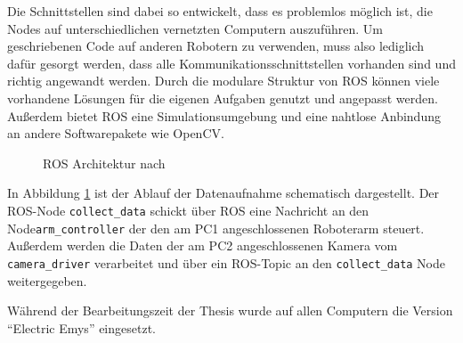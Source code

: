 Die Schnittstellen sind dabei so entwickelt, dass es problemlos möglich ist, die
Nodes auf unterschiedlichen vernetzten Computern auszuführen.  Um geschriebenen
Code auf anderen Robotern zu verwenden, muss also lediglich dafür gesorgt werden, dass
alle Kommunikationsschnittstellen vorhanden sind und richtig angewandt werden.
Durch die modulare Struktur von \ac{ROS} können viele vorhandene Lösungen für
die eigenen Aufgaben genutzt und angepasst werden. Außerdem bietet \ac{ROS}
eine Simulationsumgebung und eine nahtlose Anbindung an andere Softwarepakete
wie OpenCV.


\begin{figure}[hbtp]


\caption{\ac{ROS} Architektur nach\cite{Haug2012}}

\label{fig:architecture_ros}

\end{figure}
In Abbildung \ref{fig:architecture_ros} ist der Ablauf der Datenaufnahme schematisch dargestellt. Der
\ac{ROS}-Node \allowbreak \texttt{collect\_data} schickt über \ac{ROS} eine Nachricht
an den Node\break \texttt{arm\_controller} der den am PC1 angeschlossenen 
Roboterarm steuert. Außerdem werden die Daten der am PC2 angeschlossenen Kamera
vom \texttt{camera\_driver} verarbeitet und über ein \ac{ROS}-Topic an den 
\texttt{collect\_data} Node weitergegeben.

Während der Bearbeitungszeit der Thesis wurde auf allen Computern die Version
"`Electric Emys"' eingesetzt.




